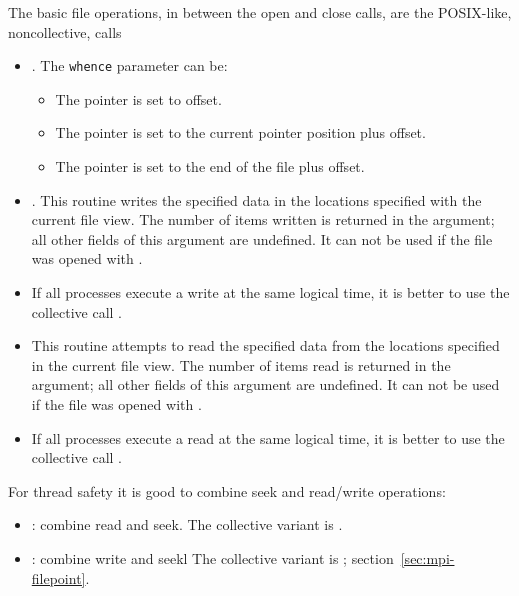 The basic file operations, in between the open and close calls, are
the POSIX-like, noncollective, calls
\begin{itemize}
\item {}. The \lstinline{whence} parameter can be:
  \begin{itemize}
  \item {} The pointer is set to offset.
  \item {} The pointer is set to the current
    pointer position plus offset.
  \item {} The pointer is set to the end of
    the file plus offset.
  \end{itemize}
\item {}. This routine writes the specified data
  in the locations specified with the current file view. 
  The number of items written is returned in the  argument;
  all other fields of this argument are undefined.
  It can not be used if the file
  was opened with .
\item If all processes execute a write at the same logical time, it is
  better to use the collective call
  .
\item {} This routine attempts to read the specified data
  from the locations specified in the current file view. 
  The number of items read is returned in the  argument;
  all other fields of this argument are undefined.
  It can not be used if the file
  was opened with .
\item If all processes execute a read at the same logical time, it is
  better to use the collective call
  .
\end{itemize}

For thread safety it is good to combine seek and read/write operations:
\begin{itemize}
\item {}: combine read and seek.
  The collective variant is .
\item {}: combine write and seekl
  The collective variant is ;
  section~\ref{sec:mpi-filepoint}.
\end{itemize}

